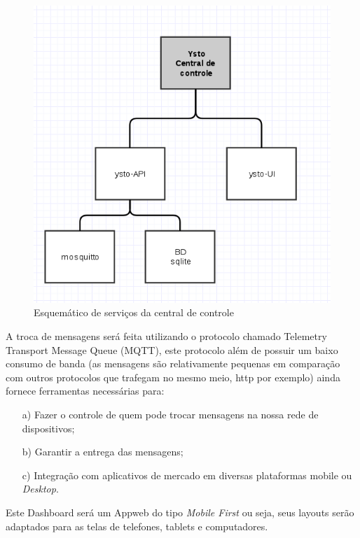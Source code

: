 \begin{figure}[H]
\caption{\label{ysto-central} Esquemático de serviços da central de controle}
\includegraphics[scale=0.5]{img/ysto-diagrama-central.png}
\end{figure}

A troca de mensagens será feita utilizando o protocolo chamado Telemetry Transport Message Queue (MQTT), este protocolo além de possuir um baixo consumo de banda (as mensagens são relativamente pequenas em comparação com outros protocolos que trafegam no mesmo meio, http por exemplo) ainda fornece ferramentas necessárias para:

\begin{itemize}
    \item[a)] Fazer o controle de quem pode trocar mensagens na nossa rede de dispositivos;
    \item[b)] Garantir a entrega das mensagens;
    \item[c)] Integração com aplicativos de mercado em diversas plataformas mobile ou \textit{Desktop}.
\end{itemize}

Este Dashboard será um Appweb do tipo \textit{Mobile First} ou seja, seus layouts serão adaptados para as telas de telefones, tablets e computadores.

